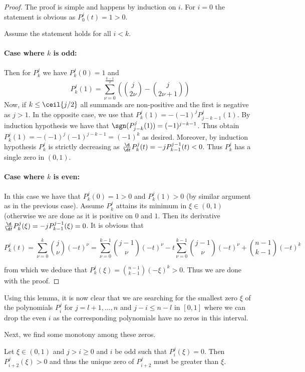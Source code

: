 \message{ !name(OnTheRAIDProblem.tex)}\documentclass[8pt,a4paper]{article}
\begin{document}
\begin{proof}
The proof is simple and happens by induction on $i$. For $i=0$ the statement is obvious as $P_0^j(t)=1>0$.

Assume the statement holds for all $i<k$. 
\paragraph{Case where $k$ is odd:}
Then for $P_k^j$ we have $P_k^j(0)=1$ and
\begin{equation}
P_k^j(1)=\sum_{\nu=0}^{\frac{k-1}{2}}{\left(\binom{j}{2\nu}-\binom{j}{2\nu+1}\right)}
\end{equation}
Now, if $k\leq \ceil{j/2}$ all summands are non-positive and the first is negative as $j>1$. In the opposite case, we use that $P_k^j(1)=-(-1)^jP_{j-k-1}^j(1)$. By induction hypothesis we have that $\sgn(P_{j-k}^j(1))=(-1)^{j-k-1}$. Thus obtain $P_k^j(1)=-(-1)^j(-1)^{j-k-1}=(-1)^k$ as desired. Moreover, by induction hypothesis $P_k^j$ is strictly decreasing as $\frac{\d}{\d t}P_k^j(t)=-jP_{k-1}^{j-1}(t)<0$. Thus $P_k^j$ has a single zero in $(0,1)$.
\paragraph{Case where $k$ is even:} In this case we have that $P_k^j(0)=1>0$ and $P_k^j(1)>0$ (by similar argument as in the previous case). Assume $P_k^j$ attains its minimum in $\xi\in(0,1)$ (otherwise we are done as it is positive on $0$ and $1$. Then its derivative $\frac{\d}{\d t}P_k^j(\xi)=-jP_{k-1}^{j-1}(\xi)=0$. It is obvious that

\begin{equation}
P_k^j(t)=\sum_{\nu=0}^k{\binom{j}{\nu}(-t)^\nu}=\sum_{\nu=0}^{k-1}{\binom{j-1}{\nu}(-t)^\nu}-t\sum_{\nu=0}^{k-1}{\binom{j-1}{\nu}(-t)^\nu}+\binom{n-1}{k-1}(-t)^k
\end{equation}

from which we deduce that $P_k^j(\xi)=\binom{n-1}{k-1}(-\xi)^k>0$. Thus we are done with the proof.
\end{proof}

Using this lemma, it is now clear that we are searching for the smallest zero $\xi$ of the polynomials $P_i^j$ for $j=l+1,\ldots,n$ and $j-i\leq n-l$ in $[0,1]$ where we can drop the even $i$ as the corresponding polynomials have no zeros in this interval. 

Next, we find some monotony among these zeros.

\begin{lemma}
Let $\xi\in(0,1)$ and $j>i\geq 0$ and $i$ be odd such that $P_i^j(\xi)=0$. Then $P_{i+2}^j(\xi)>0$ and thus the unique zero of $P_{i+2}^j$ must be greater than $\xi$.
\end{lemma}
\end{document}
